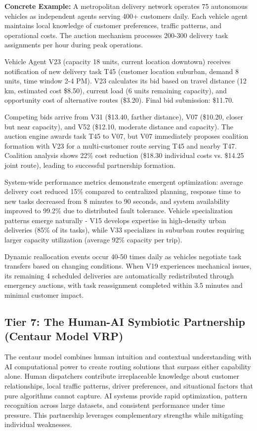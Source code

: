 \documentclass{article}
\begin{document}
\textbf{Concrete Example:} A metropolitan delivery network operates 75 autonomous vehicles as independent agents serving 400+ customers daily. Each vehicle agent maintains local knowledge of customer preferences, traffic patterns, and operational costs. The auction mechanism processes 200-300 delivery task assignments per hour during peak operations.

Vehicle Agent V23 (capacity 18 units, current location downtown) receives notification of new delivery task T45 (customer location suburban, demand 8 units, time window 2-4 PM). V23 calculates its bid based on travel distance (12 km, estimated cost \$8.50), current load (6 units remaining capacity), and opportunity cost of alternative routes (\$3.20). Final bid submission: \$11.70.

Competing bids arrive from V31 (\$13.40, farther distance), V07 (\$10.20, closer but near capacity), and V52 (\$12.10, moderate distance and capacity). The auction engine awards task T45 to V07, but V07 immediately proposes coalition formation with V23 for a multi-customer route serving T45 and nearby T47. Coalition analysis shows 22\% cost reduction (\$18.30 individual costs vs. \$14.25 joint route), leading to successful partnership formation.

System-wide performance metrics demonstrate emergent optimization: average delivery cost reduced 15\% compared to centralized planning, response time to new tasks decreased from 8 minutes to 90 seconds, and system availability improved to 99.2\% due to distributed fault tolerance. Vehicle specialization patterns emerge naturally - V15 develops expertise in high-density urban deliveries (85\% of its tasks), while V33 specializes in suburban routes requiring larger capacity utilization (average 92\% capacity per trip).

Dynamic reallocation events occur 40-50 times daily as vehicles negotiate task transfers based on changing conditions. When V19 experiences mechanical issues, its remaining 4 scheduled deliveries are automatically redistributed through emergency auctions, with task reassignment completed within 3.5 minutes and minimal customer impact.

\subsection{Tier 7: The Human-AI Symbiotic Partnership (Centaur Model VRP)}

The centaur model combines human intuition and contextual understanding with AI computational power to create routing solutions that surpass either capability alone. Human dispatchers contribute irreplaceable knowledge about customer relationships, local traffic patterns, driver preferences, and situational factors that pure algorithms cannot capture. AI systems provide rapid optimization, pattern recognition across large datasets, and consistent performance under time pressure. This partnership leverages complementary strengths while mitigating individual weaknesses.
\end{document}
